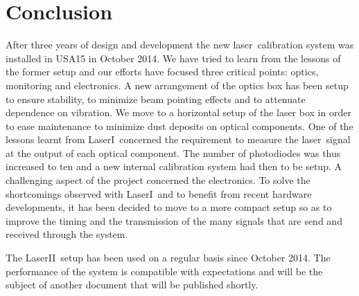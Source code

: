 \documentclass[UKenglish,texlive=2013]{\ATLASLATEXPATH atlasdoc}
\newcommand{\laser}{laser}
\newcommand{\lasi}{LaserI}
\newcommand{\lasii}{LaserII}
\begin{document}
\section{Conclusion}
\label{sec:conclusion}

After three years of design and development the new \laser~calibration system was installed in USA15 in October 2014. We have tried to learn from the lessons of the former setup and our efforts have focused three critical points: optics, monitoring and electronics. A new arrangement of the optics box has been setup to ensure stability, to minimize beam pointing effects and to attenuate dependence on vibration. We move to a horizontal setup of the laser box in order to ease maintenance to minimize dust deposits on optical components.
One of the lessons learnt from \lasi~concerned the requirement to measure the \laser~signal at the output of each optical component. The number of photodiodes was thus increased to ten and a new internal calibration system had then to be setup. A challenging aspect of the project concerned the electronics. To solve the shortcomings observed with \lasi~and to benefit from recent hardware developments, it has been decided to move to a more compact setup so as to improve the timing and the transmission of the many signals that are send and received through the system.

The \lasii~setup has been used on a regular basis since October 2014. The performance of the system is compatible with expectations and will be the subject of another document that will be published shortly.

\begin{comment}
\section*{Acknowledgements}

%

The \texttt{atlaslatex} package contains the acknowledgements that were valid 
at the time of the release you are using.
These can be found in the \texttt{acknowledgements} subdirectory.
When your ATLAS paper or PUB/CONF note is ready to be published,
download the latest set of acknowledgements from:\\
\url{https://twiki.cern.ch/twiki/bin/view/AtlasProtected/PubComAcknowledgements}

The supporting notes for the analysis should also contain a list of contributors.
This information should usually be included in \texttt{mydocument-metadata.tex}.
The list should be printed either here or before the table of contents.
\end{comment}
\end{document}
